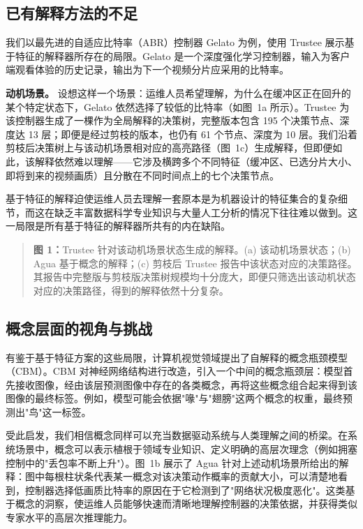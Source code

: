 \documentclass[11pt,a4paper]{article}
\begin{document}
\subsection{已有解释方法的不足}

我们以最先进的自适应比特率（ABR）控制器 Gelato 为例，使用 Trustee 展示基于特征的解释器所存在的局限。Gelato 是一个深度强化学习控制器，输入为客户端观看体验的历史记录，输出为下一个视频分片应采用的比特率。

\textbf{动机场景。} 设想这样一个场景：运维人员希望理解，为什么在缓冲区正在回升的某个特定状态下，Gelato 依然选择了较低的比特率（如图~1a 所示）。Trustee 为该控制器生成了一棵作为全局解释的决策树，完整版本包含 195 个决策节点、深度达 13 层；即便是经过剪枝的版本，也仍有 61 个节点、深度为 10 层。我们沿着剪枝后决策树上与该动机场景相对应的高亮路径（图~1c）生成解释，但即便如此，该解释依然难以理解——它涉及横跨多个不同特征（缓冲区、已选分片大小、即将到来的视频画质）且分散在不同时间点上的七个决策节点。

基于特征的解释迫使运维人员去理解一套原本是为机器设计的特征集合的复杂细节，而这在缺乏丰富数据科学专业知识与大量人工分析的情况下往往难以做到。这一局限是所有基于特征的解释器所共有的内在缺陷。

\begin{quote}\small\noindent\textbf{图 1：}Trustee 针对该动机场景状态生成的解释。(a) 该动机场景状态；(b) Agua 基于概念的解释；(c) 剪枝后 Trustee 报告中该状态对应的决策路径。其报告中完整版与剪枝版决策树规模均十分庞大，即便只筛选出该动机状态对应的决策路径，得到的解释依然十分复杂。\end{quote}

\subsection{概念层面的视角与挑战}

有鉴于基于特征方案的这些局限，计算机视觉领域提出了自解释的概念瓶颈模型（CBM）。CBM 对神经网络结构进行改造，引入一个中间的概念瓶颈层：模型首先接收图像，经由该层预测图像中存在的各类概念，再将这些概念组合起来得到该图像的最终标签。例如，模型可能会依据"喙"与"翅膀"这两个概念的权重，最终预测出"鸟"这一标签。

受此启发，我们相信概念同样可以充当数据驱动系统与人类理解之间的桥梁。在系统场景中，概念可以表示植根于领域专业知识、定义明确的高层次理念（例如拥塞控制中的"丢包率不断上升"）。图~1b 展示了 Agua 针对上述动机场景所给出的解释：图中每根柱状条代表某一概念对该决策动作概率的贡献大小，可以清楚地看到，控制器选择低画质比特率的原因在于它检测到了"网络状况极度恶化"。这类基于概念的洞察，使运维人员能够快速而清晰地理解控制器的决策依据，并获得类似专家水平的高层次推理能力。
\end{document}
